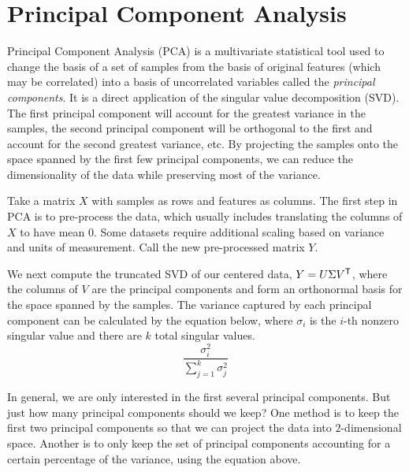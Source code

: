 \labdependencies{}
\label{lab:pca}

\section*{Principal Component Analysis} %

Principal Component Analysis (PCA) is a multivariate statistical tool used to change the basis of a set of samples from the basis of original features (which may be correlated) into a basis of uncorrelated variables called the \emph{principal components}.
It is a direct application of the singular value decomposition (SVD).
The first principal component will account for the greatest variance in the samples, the second principal component will be orthogonal to the first and account for the second greatest variance, etc.
By projecting the samples onto the space spanned by the first few principal components, we can reduce the dimensionality of the data while preserving most of the variance.

Take a matrix $X$ with samples as rows and features as columns.
The first step in PCA is to pre-process the data, which usually includes translating the columns of $X$ to have mean 0.
Some datasets require additional scaling based on variance and units of measurement.
Call the new pre-processed matrix $Y$.

We next compute the truncated SVD of our centered data, $Y = U\Sigma V^{\mathsf T} $, where the columns of $V$ are the principal components and form an orthonormal basis for the space spanned by the samples.
The variance captured by each principal component can be calculated by the equation below, where $\sigma_{i}$ is the $i$-th nonzero singular value and there are $k$ total singular values.
\begin{equation}
\frac{\sigma^2_{i}}{\sum_{j=1}^{k} \sigma^2_{j}}
\label{equation:pc}
\end{equation}

In general, we are only interested in the first several principal components.
But just how many principal components should we keep?
One method is to keep the first two principal components so that we can project the data into $2$-dimensional space.
Another is to only keep the set of principal components accounting for a certain percentage of the variance, using the equation above.

